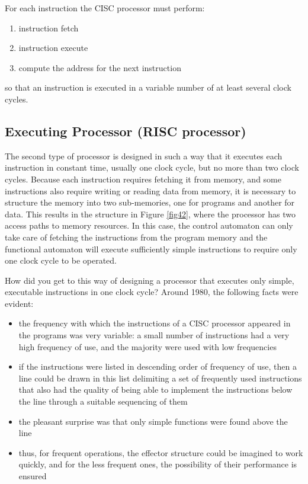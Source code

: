 
For each instruction the CISC processor must perform:
\begin{enumerate}
    \item instruction fetch
    \item instruction execute
    \item compute the address for the next instruction
\end{enumerate}
so that an instruction is executed in a variable number of at least several clock cycles.

\subsection{Executing Processor (RISC processor)}

The second type of processor is designed in such a way that it executes each instruction in constant time, usually one clock cycle, but no more than two clock cycles. Because each instruction requires fetching it from memory, and some instructions also require writing or reading data from memory, it is necessary to structure the memory into two sub-memories, one for programs and another for data. This results in the structure in Figure \ref{fig42}, where the processor has two access paths to memory resources.
In this case, the control automaton can only take care of fetching the instructions from the program memory and the functional automaton will execute sufficiently simple instructions to require only one clock cycle to be operated.

How did you get to this way of designing a processor that executes only simple, executable instructions in one clock cycle? Around 1980, the following facts were evident:


\begin{itemize}
    \item the frequency with which the instructions of a CISC processor appeared in the programs was very variable: a small number of instructions had a very high frequency of use, and the majority were used with low frequencies

    \item if the instructions were listed in descending order of frequency of use, then a line could be drawn in this list delimiting a set of frequently used instructions that also had the quality of being able to implement the instructions below the line through a suitable sequencing of them

    \item the pleasant surprise was that only simple functions were found above the line

    \item thus, for frequent operations, the effector structure could be imagined to work quickly, and for the less frequent ones, the possibility of their performance is ensured
\end{itemize}


